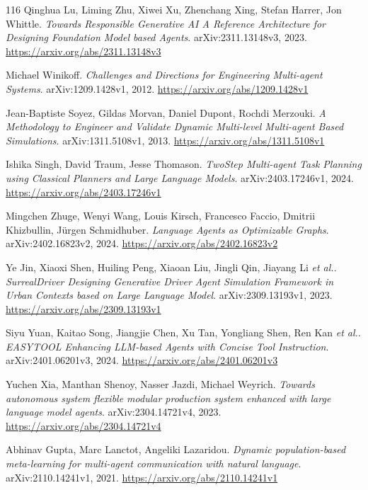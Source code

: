 \documentclass[11pt,a4paper]{article}
\begin{document}
\begin{thebibliography}{116}
Qinghua Lu, Liming Zhu, Xiwei Xu, Zhenchang Xing, Stefan Harrer, Jon Whittle.
\newblock \emph{Towards Responsible Generative AI A Reference Architecture for Designing Foundation Model based Agents}.
\newblock arXiv:2311.13148v3, 2023.
\newblock \url{https://arxiv.org/abs/2311.13148v3}

Michael Winikoff.
\newblock \emph{Challenges and Directions for Engineering Multi-agent Systems}.
\newblock arXiv:1209.1428v1, 2012.
\newblock \url{https://arxiv.org/abs/1209.1428v1}

Jean-Baptiste Soyez, Gildas Morvan, Daniel Dupont, Rochdi Merzouki.
\newblock \emph{A Methodology to Engineer and Validate Dynamic Multi-level Multi-agent Based Simulations}.
\newblock arXiv:1311.5108v1, 2013.
\newblock \url{https://arxiv.org/abs/1311.5108v1}

Ishika Singh, David Traum, Jesse Thomason.
\newblock \emph{TwoStep Multi-agent Task Planning using Classical Planners and Large Language Models}.
\newblock arXiv:2403.17246v1, 2024.
\newblock \url{https://arxiv.org/abs/2403.17246v1}

Mingchen Zhuge, Wenyi Wang, Louis Kirsch, Francesco Faccio, Dmitrii Khizbullin, J\"{u}rgen Schmidhuber.
\newblock \emph{Language Agents as Optimizable Graphs}.
\newblock arXiv:2402.16823v2, 2024.
\newblock \url{https://arxiv.org/abs/2402.16823v2}

Ye Jin, Xiaoxi Shen, Huiling Peng, Xiaoan Liu, Jingli Qin, Jiayang Li \emph{et al.}.
\newblock \emph{SurrealDriver Designing Generative Driver Agent Simulation Framework in Urban Contexts based on Large Language Model}.
\newblock arXiv:2309.13193v1, 2023.
\newblock \url{https://arxiv.org/abs/2309.13193v1}

Siyu Yuan, Kaitao Song, Jiangjie Chen, Xu Tan, Yongliang Shen, Ren Kan \emph{et al.}.
\newblock \emph{EASYTOOL Enhancing LLM-based Agents with Concise Tool Instruction}.
\newblock arXiv:2401.06201v3, 2024.
\newblock \url{https://arxiv.org/abs/2401.06201v3}

Yuchen Xia, Manthan Shenoy, Nasser Jazdi, Michael Weyrich.
\newblock \emph{Towards autonomous system flexible modular production system enhanced with large language model agents}.
\newblock arXiv:2304.14721v4, 2023.
\newblock \url{https://arxiv.org/abs/2304.14721v4}

Abhinav Gupta, Marc Lanctot, Angeliki Lazaridou.
\newblock \emph{Dynamic population-based meta-learning for multi-agent communication with natural language}.
\newblock arXiv:2110.14241v1, 2021.
\newblock \url{https://arxiv.org/abs/2110.14241v1}


\end{thebibliography}
\end{document}
